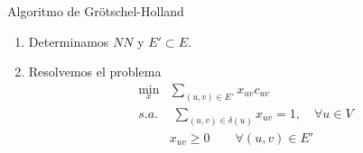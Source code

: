 \documentclass{beamer}
\begin{document}
\begin{frame}{Algoritmo de Grötschel-Holland}
\begin{enumerate}
\item Determinamos $NN$ y $E'\subset E$.
\item Resolvemos el problema
\begin{align*}
\min_x & \sum_{(u,v) \in E'}x_{uv}c_{uv}\\
s.a.&\;\sum_{(u,v)\in\delta(u)} x_{uv} = 1, \quad \forall u \in V\\
&x_{uv} \geq 0 \qquad \forall(u,v)\in E'
\end{align*}
\end{enumerate}

\end{frame}
\end{document}
